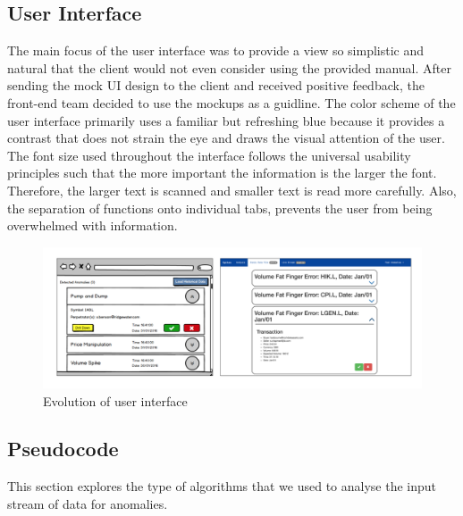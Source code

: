 \documentclass[12pt]{article}
\begin{document}
  \subsection{User Interface}
         The main focus of the user interface was to provide a view so simplistic and natural that the client would not even consider using the provided manual. After sending the mock UI design
         to the client and received positive feedback, the front-end team decided to use the mockups as a guidline.\newline
         The color scheme of the user interface primarily uses a familiar but refreshing blue because it provides a contrast that does not strain the eye and draws the visual attention of the user.
         The font size used throughout the interface follows the universal usability principles such that the more important the information is the larger the font. Therefore, the larger text is scanned
         and smaller text is read more carefully. Also, the separation of functions onto individual tabs, prevents the user from being overwhelmed with information.
         \begin{figure}[H]
         \centering
         \includegraphics[width=170mm]{ui1.png}
         \caption{Evolution of user interface}
         \end{figure}
  \subsection{Pseudocode}
    This section explores the type of algorithms that we used to analyse the input stream of data for anomalies.
\end{document}
